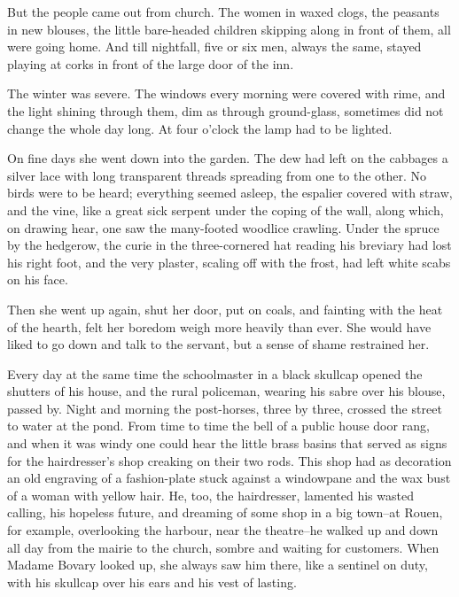 \documentclass[11pt,twocolumn]{ltugboat}
\begin{document}
But the people came out from church. The women in waxed clogs, the
peasants in new blouses, the little bare-headed children skipping along
in front of them, all were going home. And till nightfall, five or six
men, always the same, stayed playing at corks in front of the large door
of the inn.

The winter was severe. The windows every morning were covered with
rime, and the light shining through them, dim as through ground-glass,
sometimes did not change the whole day long. At four o'clock the lamp
had to be lighted.

On fine days she went down into the garden. The dew had left on the
cabbages a silver lace with long transparent threads spreading from one
to the other. No birds were to be heard; everything seemed asleep, the
espalier covered with straw, and the vine, like a great sick serpent
under the coping of the wall, along which, on drawing hear, one saw the
many-footed woodlice crawling. Under the spruce by the hedgerow, the
curie in the three-cornered hat reading his breviary had lost his right
foot, and the very plaster, scaling off with the frost, had left white
scabs on his face.

Then she went up again, shut her door, put on coals, and fainting with
the heat of the hearth, felt her boredom weigh more heavily than ever.
She would have liked to go down and talk to the servant, but a sense of
shame restrained her.

Every day at the same time the schoolmaster in a black skullcap opened
the shutters of his house, and the rural policeman, wearing his sabre
over his blouse, passed by. Night and morning the post-horses, three by
three, crossed the street to water at the pond. From time to time the
bell of a public house door rang, and when it was windy one could hear
the little brass basins that served as signs for the hairdresser's shop
creaking on their two rods. This shop had as decoration an old engraving
of a fashion-plate stuck against a windowpane and the wax bust of a
woman with yellow hair. He, too, the hairdresser, lamented his wasted
calling, his hopeless future, and dreaming of some shop in a big
town--at Rouen, for example, overlooking the harbour, near the
theatre--he walked up and down all day from the mairie to the church,
sombre and waiting for customers. When Madame Bovary looked up, she
always saw him there, like a sentinel on duty, with his skullcap over
his ears and his vest of lasting.
\end{document}
